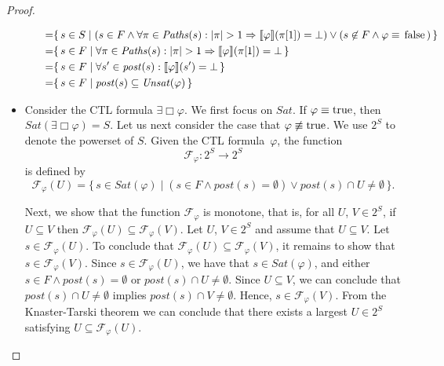 \documentclass[12pt]{article}
\newcommand{\always}{\Box}
\newcommand{\TRUE}{\mbox{\lstinline{true}}}
\newcommand{\FALSE}{\mbox{\lstinline{false}}}
\theoremstyle{definition}
\newcommand{\satisfaction}[1]{\llbracket #1 \rrbracket}
\newcommand{\bottom}{\mathord{\perp}}
\newenvironment{franck}{\color{red}}{\color{black}}
\begin{document}
\begin{proof}
\begin{itemize}
\begin{franck}
\begin{itemize}
\begin{align*}
= & \{\, s \in S \mid (s \in F \wedge \forall \pi \in \mathit{Paths}(s) : |\pi| > 1 \Rightarrow \satisfaction{\varphi}(\pi[1]) = \bottom) \vee (s \not\in F \wedge \varphi \equiv \FALSE) \,\}\\
= & \{\, s \in F \mid \forall \pi \in \mathit{Paths}(s) : |\pi| > 1 \Rightarrow \satisfaction{\varphi}(\pi[1]) = \bottom \,\}\\
= & \{\, s \in F \mid \forall s' \in \mathit{post}(s) : \satisfaction{\varphi}(s') = \bottom \,\}\\
= & \{\, s \in F \mid \mathit{post}(s) \subseteq \mathit{Unsat}(\varphi) \,\}
\end{align*}
\end{itemize}
\item
Consider the CTL formula $\exists \always \varphi$.  We first focus on $\mathit{Sat}$.  If $\varphi \equiv \TRUE$, then $\mathit{Sat}(\exists \always \varphi) = S$.  Let us next consider the case that $\varphi \not\equiv \TRUE$.  We use $2^S$ to denote the powerset of $S$.  Given the CTL formula~$\varphi$, the function
\[
\mathcal{F}_{\varphi} : 2^S \to 2^S
\]
is defined by
\[
\mathcal{F}_{\varphi}(U) = \{\, s \in \mathit{Sat}(\varphi) \mid (s \in F \wedge \mathit{post}(s) = \emptyset) \vee \mathit{post}(s) \cap U \not= \emptyset \,\}.
\]

Next, we show that the function $\mathcal{F}_{\varphi}$ is monotone, that is, for all $U$, $V \in 2^S$, if $U \subseteq V$ then $\mathcal{F}_{\varphi}(U) \subseteq \mathcal{F}_{\varphi}(V)$.  Let $U$, $V \in 2^S$ and assume that $U \subseteq V$.  Let $s \in \mathcal{F}_{\varphi}(U)$. To conclude that $\mathcal{F}_{\varphi}(U) \subseteq \mathcal{F}_{\varphi}(V)$, it remains to show that $s \in \mathcal{F}_{\varphi}(V)$.  Since $s \in \mathcal{F}_{\varphi}(U)$, we have that $s \in \mathit{Sat}(\varphi)$, and either $s \in F \wedge \mathit{post}(s) = \emptyset$ or $\mathit{post}(s) \cap U \not= \emptyset$.  Since $U \subseteq V$, we can conclude that $\mathit{post}(s) \cap U \not= \emptyset$ implies $\mathit{post}(s) \cap V \not= \emptyset$.  Hence, $s \in \mathcal{F}_{\varphi}(V)$.  From the Knaster-Tarski theorem \cite{K28,T55} we can conclude that there exists a largest $U \in 2^S$ satisfying $U \subseteq \mathcal{F}_{\varphi}(U)$.


\end{franck}
\end{itemize}
\end{proof}
\end{document}
